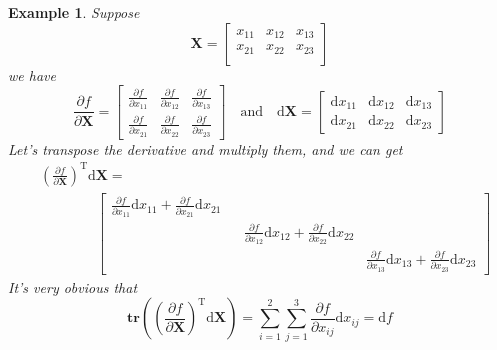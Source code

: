 \documentclass{article}
\newcommand{\MatrixDerivative}[2]{
    \ensuremath{\frac{\partial#1}{\partial#2}}
}
\newcommand{\Transpose}{\ensuremath{\mathrm{T}}}
\newcommand{\Trace}{\ensuremath{\mathbf{tr}}}
\newcommand{\Differential}{\ensuremath{\mathrm{d}}}
\newcommand{\MatrixSymbol}[1]{\ensuremath{{\boldsymbol{#1}}}}
\newcommand{\MatrixX}{\MatrixSymbol{X}}
\newtheorem{Example}{Example}[section]
\theoremstyle{nonumberplain}
\begin{document}
\begin{Example}\label{example:2-1}
    Suppose \begin{equation*}
        \MatrixX=\begin{bmatrix}
            x_{11}&x_{12}&x_{13}\\
            x_{21}&x_{22}&x_{23}\\
        \end{bmatrix}
    \end{equation*}
    we have
    \begin{equation*}
        \frac{\partial f}{\partial \MatrixX}=
        \begin{bmatrix}
            \frac{\partial f}{\partial x_{11}}&\frac{\partial f}{\partial x_{12}}&\frac{\partial f}{\partial x_{13}}\\
            \frac{\partial f}{\partial x_{21}}&\frac{\partial f}{\partial x_{22}}&\frac{\partial f}{\partial x_{23}}
        \end{bmatrix}
        \quad \text{and} \quad
        \Differential \MatrixX=\begin{bmatrix}
            \Differential x_{11}&\Differential x_{12}&\Differential x_{13}\\
            \Differential x_{21}&\Differential x_{22}&\Differential x_{23}
        \end{bmatrix}
    \end{equation*}
    Let's transpose the derivative and multiply them, and we can get
    \begin{equation*}
        \begin{split}
            &\left(\frac{\partial f}{\partial \MatrixX}\right)^\Transpose \Differential \MatrixX=\\
            &\qquad\qquad\begin{bmatrix}
                \frac{\partial f}{\partial x_{11}}\Differential x_{11}+\frac{\partial f}{\partial x_{21}}\Differential x_{21}&&\\
                &&\frac{\partial f}{\partial x_{12}}\Differential x_{12}+\frac{\partial f}{\partial x_{22}}\Differential x_{22}&\\
                &&&\frac{\partial f}{\partial x_{13}}\Differential x_{13}+\frac{\partial f}{\partial x_{23}}\Differential x_{23}
            \end{bmatrix}
        \end{split}
    \end{equation*}
    It's very obvious that\begin{equation}
        \Trace\left(
            \left(\frac{\partial f}{\partial \MatrixX}\right)^\Transpose \Differential \MatrixX
        \right)=\sum_{i=1}^2 \sum_{j=1}^3 \MatrixDerivative{f}{x_{ij}}\Differential x_{ij}=\Differential f
    \end{equation}
\end{Example}
\end{document}
